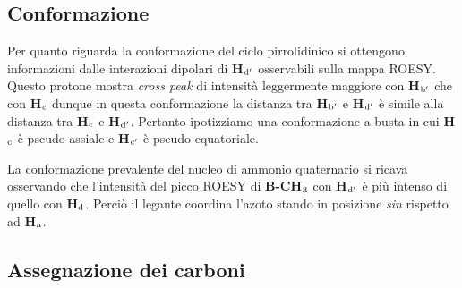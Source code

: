 \documentclass[a4paper, italian, oneside, 12pt]{article}
\begin{document}
\begin{figure}
\vspace{-20pt}
\end{figure}


\subsection{Conformazione}

Per quanto riguarda la conformazione del ciclo pirrolidinico si ottengono informazioni dalle interazioni dipolari di {\bf{H$_{\textrm d'}$}} osservabili sulla mappa ROESY. Questo protone mostra {\emph{cross peak}} di intensità leggermente maggiore con {\bf{H$_{\textrm b'}$}} che con {\bf{H$_{\textrm c}$}} dunque in questa conformazione la distanza tra {\bf{H$_{\textrm b'}$}} e {\bf{H$_{\textrm d'}$}} è simile alla distanza tra {\bf{H$_{\textrm c}$}} e {\bf{H$_{\textrm d'}$}}. Pertanto ipotizziamo una conformazione a busta in cui {\bf{H$_{\textrm c}$}} è pseudo-assiale e {\bf{H$_{\textrm c'}$}} è pseudo-equatoriale.

La conformazione prevalente del nucleo di ammonio quaternario si ricava osservando che l'intensità del picco ROESY di {\bf{B-CH$_{\textrm 3}$}} con {\bf{H$_{\textrm d'}$}} è più intenso di quello con {\bf{H$_{\textrm d}$}}. Perciò  il legante  coordina l'azoto stando in posizione \emph{sin} rispetto ad {\bf{H$_{\textrm a}$}}. 

\subsection{Assegnazione dei carboni}
\end{document}
